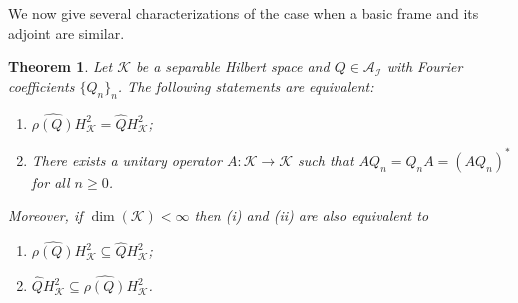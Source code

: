 \documentclass[a4paper,12pt]{amsart}
\def\cA{{\mathcal{A}}}
\def\cI{{\mathcal{I}}}
\def\KK{{\mathcal{K}}}
\newtheorem{theorem}{Theorem}[section]
\theoremstyle{definition}
\begin{document}
We now give several characterizations of the case when a basic frame and its adjoint are similar.

\begin{theorem}\label{thm:similarity}
Let $\KK$ be a separable Hilbert space and $Q\in\cA_\cI$ with Fourier coefficients $\{Q_n\}_n$. The following statements are equivalent:
\begin{enumerate}[label=(\roman*),ref=(\roman*)]
\item $\widehat{\rho(Q)}H^2_\KK=\widehat{Q}H^2_\KK$;

\item There exists a unitary operator $A:\KK\to\KK$ such that $AQ_n=Q_nA=(AQ_n)^*$ for all $n\geqslant0$.
\end{enumerate}
Moreover, if $\dim(\KK) <\infty$ then (i) and (ii) are also equivalent to
\begin{enumerate}[label=(\roman*),ref=(\roman*)]
\item[(iii)] $\widehat{\rho(Q)}H^2_\KK\subseteq\widehat{Q}H^2_\KK$;

\item[(iv)] $\widehat{Q}H^2_\KK\subseteq\widehat{\rho(Q)}H^2_\KK$.
\end{enumerate}
\end{theorem}
\end{document}
